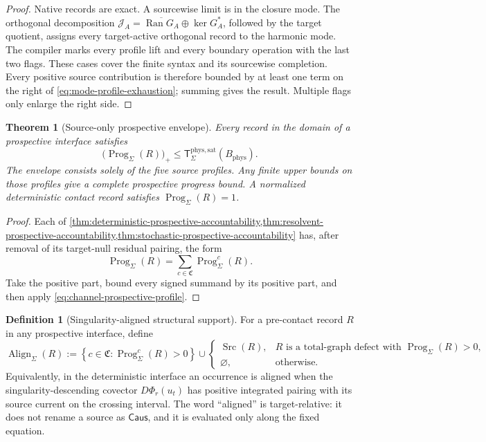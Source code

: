 \documentclass[11pt]{article}
\numberwithin{section}{part}
\theoremstyle{plain}
\newtheorem{theorem}{Theorem}[section]
\theoremstyle{definition}
\newtheorem{definition}[definition]{Definition}
\theoremstyle{remark}
\newcommand{\Caus}{\mathsf{Caus}}
\newcommand{\Channels}{\mathfrak C}
\newcommand{\Src}{\operatorname{Src}}
\newcommand{\Align}{\operatorname{Align}}
\newcommand{\Phys}{\mathrm{phys}}
\newcommand{\Sat}{\mathrm{sat}}
\newcommand{\Budget}{B_{\Phys}}
\newcommand{\Ran}{\operatorname{Ran}}
\begin{document}
\begin{proof}
Native records are exact.  A sourcewise limit is in the closure mode.  The
orthogonal decomposition
\(\mathcal J_A=\overline{\Ran G_A}\oplus\ker G_A^*\), followed by the target
quotient, assigns every target-active orthogonal record to the harmonic mode.
The compiler marks every profile lift and every boundary operation with the
last two flags.  These cases cover the finite syntax and its sourcewise
completion.  Every positive source contribution is therefore bounded by at
least one term on the right of \eqref{eq:mode-profile-exhaustion}; summing
gives the result.  Multiple flags only enlarge the right side.
\end{proof}

\begin{theorem}[Source-only prospective envelope]
\label{thm:source-only-envelope}
Every record in the domain of a prospective interface satisfies
\begin{equation}
 \label{eq:source-only-envelope}
 \bigl(\operatorname{Prog}_\Sigma(R)\bigr)_+
 \le \mathsf T_\Sigma^{\Phys,\Sat}(\Budget).
\end{equation}
The envelope consists solely of the five source profiles.  Any finite upper
bounds on those profiles give a complete prospective progress bound.  A
normalized deterministic contact record satisfies
\(\operatorname{Prog}_\Sigma(R)=1\).
\end{theorem}

\begin{proof}
Each of
\cref{thm:deterministic-prospective-accountability,thm:resolvent-prospective-accountability,thm:stochastic-prospective-accountability}
has, after removal of its target-null residual pairing, the form
\[
 \operatorname{Prog}_\Sigma(R)
 =\sum_{c\in\Channels}\operatorname{Prog}_\Sigma^c(R).
\]
Take the positive part, bound every signed summand by its positive part, and
then apply
\eqref{eq:channel-prospective-profile}.
\end{proof}

\begin{definition}[Singularity-aligned structural support]
\label{def:singularity-aligned-support}
For a pre-contact record \(R\) in any prospective interface, define
\begin{equation}
 \label{eq:singularity-aligned-support}
 \Align_\Sigma(R)
 :=\left\{c\in\Channels:
       \operatorname{Prog}_\Sigma^c(R)>0\right\}
 \cup
 \begin{cases}
  \Src(R),&R\text{ is a total-graph defect with }
             \operatorname{Prog}_\Sigma(R)>0,\\
  \varnothing,&\text{otherwise}.
 \end{cases}
\end{equation}
Equivalently, in the deterministic interface an occurrence is aligned when
the singularity-descending covector \(D\Phi_r(u_t)\) has positive integrated
pairing with its source current on the crossing interval.
The word ``aligned'' is target-relative: it does not rename a source as
\(\Caus\), and it is evaluated only along the fixed equation.
\end{definition}
\end{document}
